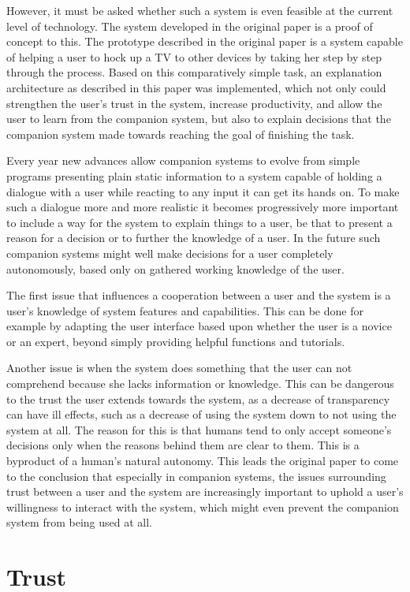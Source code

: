 \documentclass[a4paper]{article}
\begin{document}
However, it must be asked whether such a system is even feasible at the current level of technology. The system developed in the original paper is a proof of concept to this. The prototype described in the original paper is a system capable of helping a user to hock up a TV to other devices by taking her step by step through the process. Based on this comparatively simple task, an explanation architecture as described in this paper was implemented, which not only could strengthen the user's trust in the system, increase productivity, and allow the user to learn from the companion system, but also to explain decisions that the companion system made towards reaching the goal of finishing the task.

Every year new advances allow companion systems to evolve from simple programs presenting plain static information to a system capable of holding a dialogue with a user while reacting to any input it can get its hands on. To make such a dialogue more and more realistic it becomes progressively more important to include a way for the system to explain things to a user, be that to present a reason for a decision or to further the knowledge of a user. In the future such companion systems might well make decisions for a user completely autonomously, based only on gathered working knowledge of the user.

The first issue that influences a cooperation between a user and the system is a user's knowledge of system features and capabilities. This can be done for example by adapting the user interface based upon whether the user is a novice or an expert, beyond simply providing helpful functions and tutorials.

Another issue is when the system does something that the user can not comprehend because she lacks information or knowledge. This can be dangerous to the trust the user extends towards the system, as a decrease of transparency can have ill effects, such as a decrease of using the system down to not using the system at all. The reason for this is that humans tend to only accept someone's decisions only when the reasons behind them are clear to them. This is a byproduct of a human's natural autonomy. This leads the original paper to come to the conclusion that especially in companion systems, the issues surrounding trust between a user and the system are increasingly important to uphold a user's willingness to interact with the system, which might even prevent the companion system from being used at all.

\section{Trust}
\end{document}
